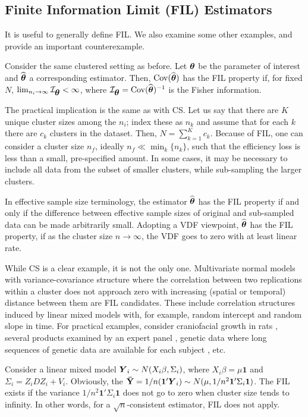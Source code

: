 \documentclass[11pt,a5paper,twoside]{book}
\newcommand{\bftheta}{\mbox{\boldmath $\theta$}}
\newcommand{\BY}{\mbox{\boldmath $Y$}}
\begin{document}
\subsection{Finite Information Limit (FIL) Estimators}
\label{sec_FIL}
It is useful to generally define FIL. We also examine some other examples, and provide an important counterexample. 

Consider the same clustered setting as before. Let $\bftheta$ be the parameter of interest and $\widehat{\bftheta}$ a corresponding estimator. Then, $\mathrm{Cov}(\widehat{\bftheta})$ has the FIL property if, for fixed $N$,  $\lim_{n_i \rightarrow \infty} \mathcal{I}_{\bftheta} < \infty$, where $\mathcal{I}_{\bftheta} = \mathrm{Cov}(\widehat{\bftheta}) ^{-1} $ is the Fisher information.

The practical implication is the same as with CS. Let us say that there are $K$ unique cluster sizes among the $n_i$; index these as $n_k$ and assume that for each $k$ there are $c_k$ clusters in the dataset. Then, $N=\sum_{k=1}^K c_k$. Because of FIL, one can consider a cluster size $n_f$, ideally $n_f \ll \min_k\{n_k\}$, such that the efficiency loss is less than a small, pre-specified amount. In some cases, it may be necessary to include all data from the subset of smaller clusters, while sub-sampling the larger clusters. 

In effective sample size terminology, the estimator $\widehat{\bftheta}$ has the FIL property if and only if the difference between effective sample sizes of original and sub-sampled data can be made arbitrarily small. Adopting a VDF viewpoint, $\widehat{\bftheta}$ has the FIL property, if as the cluster size $n\rightarrow\infty$, the VDF goes to zero with at least linear rate.

While CS is a clear example, it is not the only one. Multivariate normal models with variance-covariance structure where the correlation between two replications within a cluster does not approach zero with increasing (spatial or temporal) distance between them are FIL candidates. These include  correlation structures induced by linear mixed models with, for example, random intercept and random slope in time. For practical examples, consider craniofacial growth in rats \cite{verdonck1998}, several products examined by an expert panel \cite{milanzi2014}, genetic data where long sequences of genetic data are available for each subject \cite{sikorska2013}, etc.

Consider a linear mixed model $\BY_i \sim N(X_i\beta, \Sigma_i)$, where $X_i\beta=\mu \mathbf{1}$ and $\Sigma_i=Z_i D Z_i + V_i$. Obviously, the $\mathbf{\bar{Y}}=1/n (\mathbf{1'}\BY_i) \sim N(\mu, 1/n^2 \mathbf{1'} \Sigma_i \mathbf{1})$. The FIL exists if the variance $1/n^2 \mathbf{1'} \Sigma_i \mathbf{1}$ does not go to zero when cluster size tends to infinity. In other words, for a $\sqrt{n}$-consistent estimator, FIL does not apply. 
\end{document}
